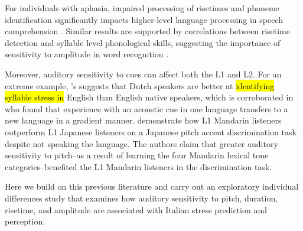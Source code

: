 For individuals with aphasia, impaired processing of risetimes and phoneme identification significantly impacts higher-level language processing in speech comprehension \citep{Kries2023}. Similar results are supported by correlations between risetime detection and syllable level phonological skills, suggesting the importance of sensitivity to amplitude in word recognition \citep{Hamalaine2005}. 

Moreover, auditory sensitivity to cues can affect both the L1 and L2. For an extreme example, \cite{cutler2007dutch}'s suggests that Dutch speakers are better at \hl{identifying syllable stress in} English than English native speakers, which is corroborated in \cite{Pajak2014} who found that experience with an acoustic cue in one language transfers to a new language in a gradient manner. \cite{wienergoss} demonstrate how L1 Mandarin listeners outperform L1 Japanese listeners on a Japanese pitch accent discrimination task despite not speaking the language. The authors claim that greater auditory sensitivity to pitch--as a result of learning the four Mandarin lexical tone categories--benefited the L1 Mandarin listeners in the discrimination task. 

Here we build on this previous literature and carry out an exploratory individual differences study that examines how auditory sensitivity to pitch, duration, risetime, and amplitude are associated with Italian stress prediction and perception.

